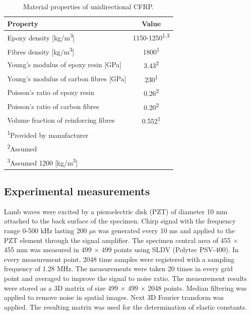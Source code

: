 \documentclass[preprint,12pt]{elsarticle}
\begin{document}
\begin{table}[h]
	\renewcommand{\arraystretch}{1.3}
	\centering \footnotesize
	\caption{Material properties of unidirectional CFRP.}
	\begin{tabular}{lc} 
		\toprule
		Property & Value \\
		\midrule
		Epoxy density [kg/m\textsuperscript{3}]& 1150-1250\textsuperscript{1,3} \\ 
		Fibres density [kg/m\textsuperscript{3}]& 1800\textsuperscript{1}\\ 
		Young’s modulus of epoxy resin [GPa] & 3.43\textsuperscript{2}\\
		Young’s modulus of carbon fibres [GPa] & 230\textsuperscript{1}\\
		Poisson’s ratio of epoxy resin & 0.26\textsuperscript{2}\\
		Poisson’s ratio of carbon fibres & 0.20\textsuperscript{2} \\
		Volume fraction of reinforcing fibres & 0.552\textsuperscript{1}\\
		\bottomrule 
		\textsuperscript{1}Provided by manufacturer &\\
		\textsuperscript{2}Assumed &\\
		\textsuperscript{3}Assumed 1200 [kg/m\textsuperscript{3}]&\\
	\end{tabular} 
	\label{tab:mat_prop_uni}
\end{table}

\subsection{Experimental measurements \label{sec:SLDV}}
Lamb waves were excited by a piezoelectric disk (PZT) of diameter 10 mm attached to the back surface of the specimen. 
Chirp signal with the frequency range 0-500 kHz lasting 200 $\mu$s was generated every 10 ms and applied to the PZT element through the signal amplifier.
The specimen central area of 455 $\times$ 455 mm was measured in 499 $\times$ 499 points using SLDV (Polytec PSV-400). 
In every measurement point, 2048 time samples were registered with a sampling frequency of 1.28 MHz. The measurements were taken 20 times in every grid point and averaged to improve the signal to noise ratio.
The measurement results were stored as a 3D matrix of size 499 $\times$ 499 $\times$ 2048 points. 
Median filtering was applied to remove noise in spatial images. Next 3D Fourier transform was applied. 
The resulting matrix was used for the determination of elastic constants.
\end{document}
